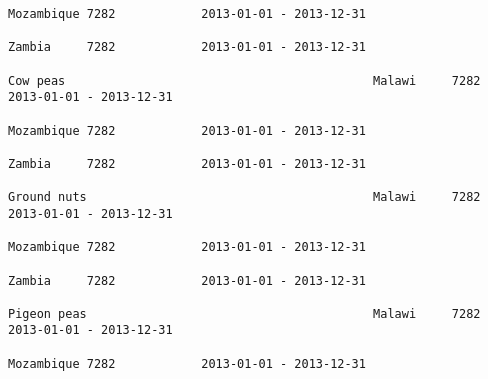 \documentclass[11pt]{article}
\begin{document}
\begin{Verbatim}[commandchars=\\\{\}]
                                                                                                                                                                                                                 Mozambique 7282            2013-01-01 - 2013-12-31   
                                                                                                                                                                                                                 Zambia     7282            2013-01-01 - 2013-12-31   
                                                                                                                                                              Cow peas                                           Malawi     7282            2013-01-01 - 2013-12-31   
                                                                                                                                                                                                                 Mozambique 7282            2013-01-01 - 2013-12-31   
                                                                                                                                                                                                                 Zambia     7282            2013-01-01 - 2013-12-31   
                                                                                                                                                              Ground nuts                                        Malawi     7282            2013-01-01 - 2013-12-31   
                                                                                                                                                                                                                 Mozambique 7282            2013-01-01 - 2013-12-31   
                                                                                                                                                                                                                 Zambia     7282            2013-01-01 - 2013-12-31   
                                                                                                                                                              Pigeon peas                                        Malawi     7282            2013-01-01 - 2013-12-31   
                                                                                                                                                                                                                 Mozambique 7282            2013-01-01 - 2013-12-31   

\end{Verbatim}
\end{document}
